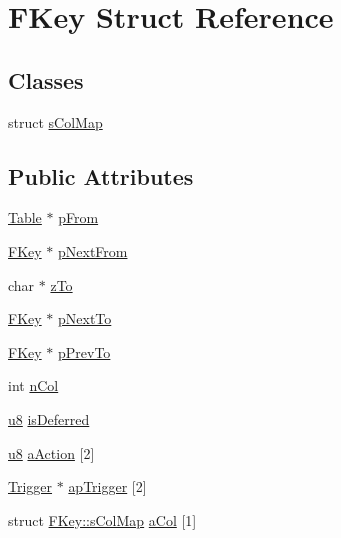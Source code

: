 \hypertarget{struct_f_key}{\section{F\-Key Struct Reference}
\label{struct_f_key}
}
\subsection*{Classes}
\begin{DoxyCompactItemize}
\item 
struct \hyperlink{struct_f_key_1_1s_col_map}{s\-Col\-Map}
\end{DoxyCompactItemize}
\subsection*{Public Attributes}
\begin{DoxyCompactItemize}
\item 
\hyperlink{struct_table}{Table} $\ast$ \hyperlink{struct_f_key_a6d476f3fbfa75a19c5c5a9edec4e79eb}{p\-From}
\item 
\hyperlink{struct_f_key}{F\-Key} $\ast$ \hyperlink{struct_f_key_ac64ff66b30167715c8822a74c2809075}{p\-Next\-From}
\item 
char $\ast$ \hyperlink{struct_f_key_a1eac10bab38a0ac9f88306fbbabbe5d6}{z\-To}
\item 
\hyperlink{struct_f_key}{F\-Key} $\ast$ \hyperlink{struct_f_key_ac29b26999113602e7e3921bf07643c04}{p\-Next\-To}
\item 
\hyperlink{struct_f_key}{F\-Key} $\ast$ \hyperlink{struct_f_key_a56189e420e91df86513e6895db518eca}{p\-Prev\-To}
\item 
int \hyperlink{struct_f_key_a611e3223f3f434e0a635e036dc100cbb}{n\-Col}
\item 
\hyperlink{sqlite3_8c_a74a0f6424ae628af25f23f0a35f6ead3}{u8} \hyperlink{struct_f_key_ab742714b17f2c13353837e1fdde51cc7}{is\-Deferred}
\item 
\hyperlink{sqlite3_8c_a74a0f6424ae628af25f23f0a35f6ead3}{u8} \hyperlink{struct_f_key_a68a08f58294bf845e9c77d785499d222}{a\-Action} \mbox{[}2\mbox{]}
\item 
\hyperlink{struct_trigger}{Trigger} $\ast$ \hyperlink{struct_f_key_a9ce15cb27b675836bc714ab18fd8a008}{ap\-Trigger} \mbox{[}2\mbox{]}
\item 
struct \hyperlink{struct_f_key_1_1s_col_map}{F\-Key\-::s\-Col\-Map} \hyperlink{struct_f_key_a5b230bc6c10a67f432ed7d5ebc92bcd2}{a\-Col} \mbox{[}1\mbox{]}
\end{DoxyCompactItemize}


